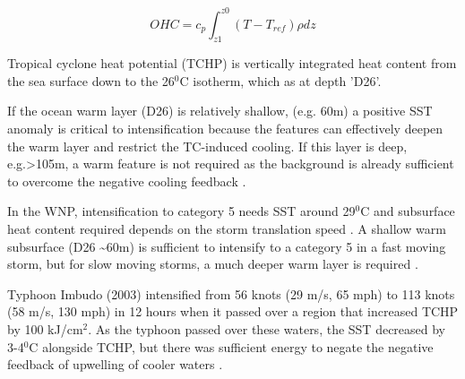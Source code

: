 \begin{equation}
OHC = c_{p} \int_{z1}^{z0} (T-T_{ref}) \rho dz
\end{equation} 	


Tropical cyclone heat potential (TCHP) is vertically integrated heat content from the sea surface down to the 26$^0$C isotherm, which as at depth 'D26'.

If the ocean warm layer (D26) is relatively shallow, (e.g. 60m) a positive SST anomaly is critical to intensification because the features can effectively deepen the warm layer and restrict the TC-induced cooling. If this layer is deep, e.g.\textgreater 105m, a warm feature is not required as the background is already sufficient to overcome the negative cooling feedback \citep{lin2008upper}.

In the WNP, intensification to category 5 needs SST around 29$^0$C and subsurface heat content required depends on the storm translation speed \citep{lin2009upper}. A shallow warm subsurface (D26 \textasciitilde 60m) is sufficient to intensify to a category 5 in a fast moving storm, but for slow moving storms, a much deeper warm layer is required \citep{lin2009upper}.


Typhoon Imbudo (2003) intensified from 56 knots (29 m/s, 65 mph) to 113 knots (58 m/s, 130 mph) in 12 hours when it passed over a region that increased TCHP by 100 kJ/cm$^2$. As the typhoon passed over these waters, the SST decreased by 3-4$^0$C alongside TCHP, but there was sufficient energy to negate the negative feedback of upwelling of cooler waters \citep{goni2003ocean}.


